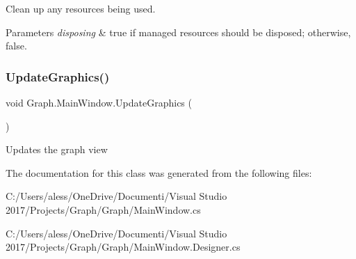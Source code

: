 Clean up any resources being used. 


\begin{DoxyParams}{Parameters}
{\em disposing} & true if managed resources should be disposed; otherwise, false.\\
\hline
\end{DoxyParams}
\mbox{\label{class_graph_1_1_main_window_a6aec2f5a712c2581c9cd08878251af3f}} 
\subsubsection{\texorpdfstring{Update\+Graphics()}{UpdateGraphics()}}
{\footnotesize\ttfamily void Graph.\+Main\+Window.\+Update\+Graphics (\begin{DoxyParamCaption}{ }\end{DoxyParamCaption})}



Updates the graph view 



The documentation for this class was generated from the following files\+:\begin{DoxyCompactItemize}
\item 
C\+:/\+Users/aless/\+One\+Drive/\+Documenti/\+Visual Studio 2017/\+Projects/\+Graph/\+Graph/Main\+Window.\+cs\item 
C\+:/\+Users/aless/\+One\+Drive/\+Documenti/\+Visual Studio 2017/\+Projects/\+Graph/\+Graph/Main\+Window.\+Designer.\+cs\end{DoxyCompactItemize}
